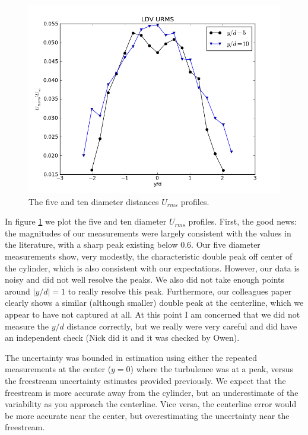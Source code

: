\documentclass{article}
\begin{document}
\begin{figure}[!htb]
 \begin{center}
  \includegraphics[width = 12 cm]{figs/urms}
  \caption{The five and ten diameter distances $U_{rms}$ profiles. }
  \label{urms}
 \end{center}
\end{figure}

In figure \ref{urms} we plot the five and ten diameter $U_{rms}$
profiles. First, the good news: the magnitudes of our measurements were
largely consistent with the values in the literature, with a sharp peak
existing below 0.6. Our five diameter measurements show, very modestly,
the characteristic double peak off center of the cylinder, which is also
consistent with our expectations. However, our data is noisy and did not
well resolve the peaks. We also did not take enough points around $|y/d|
=1$ to really resolve this peak. Furthermore, our colleagues paper
clearly shows a similar (although smaller) double peak at the
centerline, which we appear to have not captured at all. At this point I
am concerned that we did not measure the $y/d$ distance correctly, but
we really were very careful and did have an independent check (Nick did
it and it was checked by Owen). 

The uncertainty was bounded in estimation using either the repeated
measurements at the center ($y=0$) where the turbulence was at a peak,
versus the freestream uncertainty estimates provided previously. We
expect that the freestream is more accurate away from the cylinder, but
an underestimate of the variability as you approach the centerline. Vice
versa, the centerline error would be more accurate near the center, but
overestimating the uncertainty near the freestream. 
\end{document}
